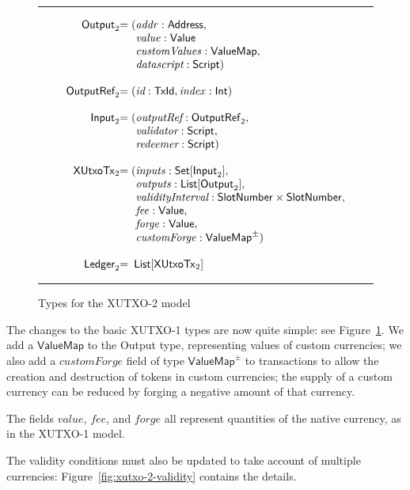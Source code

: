 \documentclass[a4paper]{article}
\renewcommand{\i}{\textit}  %
\newcommand{\s}{\textsf}  %
\theoremstyle{definition}  %
\newenvironment{arraydefs}[1]{\setlength{\arraycolsep}{0pt}\begin{array}{#1}}{\end{array}}
\newcommand\rfskip{7pt}
\newenvironment{ruledfigure}[1]{\begin{figure}[#1]\hrule\vspace{\rfskip}}{\vspace{\rfskip}\hrule\end{figure}}
\newcommand{\List}[1]{\ensuremath{\s{List}[#1]}}
\newcommand{\Set}[1]{\ensuremath{\s{Set}[#1]}}
\newcommand{\mi}[1]{\ensuremath{\mathit{#1}}}
\newcommand{\idx}{\mi{index}}
\newcommand{\inputs}{\mi{inputs}}
\newcommand{\outputs}{\mi{outputs}}
\newcommand{\forge}{\mi{forge}}
\newcommand{\fee}{\mi{fee}}
\newcommand{\addr}{\mi{addr}}
\newcommand{\val}{\mi{value}}  %
\newcommand{\customvals}{\mi{customValues}}
\newcommand{\customforge}{\mi{customForge}}
\newcommand{\msf}[1]{\ensuremath{\mathsf{#1}}}
\newcommand{\slotnum}{\msf{SlotNumber}}
\newcommand{\xutxotx}{\msf{XUtxoTx}}
\newcommand{\valuetype}{\ensuremath{\s{Value}}}
\newcommand{\valuemap}{\ensuremath{\s{ValueMap}}}
\begin{document}
\begin{ruledfigure}{H}
  \[
  \begin{arraydefs}{rll}
    \s{Output}_2 &= (&\addr: \s{Address},\\
    && \val: \valuetype\\
    && \customvals: \valuemap,\\
    && \i{datascript}: \s{Script})\\
    \\
    \s{OutputRef}_2 &= (&\i{id}: \s{TxId}, \idx: \s{Int})\\
    \\
    \s{Input}_2 &= (& \i{outputRef}: \sf{OutputRef}_2,\\
                     && \i{validator}: \s{Script},\\
                     & & \i{redeemer}: \s{Script})\\
\\
    \xutxotx_2 &= ( &\inputs: \Set{\s{Input}_2},\\
    &&\outputs: \List{\s{Output}_2},\\
    &&\i{validityInterval}: \slotnum \times \slotnum,\\
    &&\fee: \valuetype,\\
    &&\forge: \valuetype,\\
    &&\customforge: \valuemap^{\pm})\\
    \\
    \s{Ledger}_2 &=&\!\List{\xutxotx_2}\\
\end{arraydefs}
  \]
  \caption{Types for the XUTXO-2 model}
  \label{fig:xutxo-2-types}
\end{ruledfigure}

\noindent The changes to the basic XUTXO-1 types are now quite simple: see Figure~\ref{fig:xutxo-2-types}.
We add a \valuemap{} to the \s{Output} type, representing values of custom
currencies; we also add a \customforge{} field of type
$\valuemap^{\pm}$ to transactions to allow the creation and
destruction of tokens in custom currencies; the supply of a custom
currency can be reduced by forging a negative amount of that currency.

The fields \val, \fee, and \forge{} all represent quantities of the
native currency, as in the XUTXO-1 model.

\medskip
\noindent The validity conditions must also be updated to take account
of multiple currencies: Figure~\ref{fig:xutxo-2-validity} contains
the details.
\end{document}
